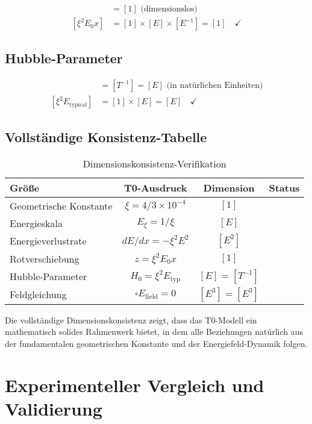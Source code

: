 \documentclass[12pt,a4paper]{article}
\begin{document}
	\begin{align}
		[z] &= [1] \text{ (dimensionslos)} \\
		[\xi^2 E_0 x] &= [1] \times [E] \times [E^{-1}] = [1] \quad \checkmark
	\end{align}
	
	\subsection{Hubble-Parameter}
	
	\begin{align}
		[H_0] &= [T^{-1}] = [E] \text{ (in natürlichen Einheiten)} \\
		[\xi^2 E_{\text{typical}}] &= [1] \times [E] = [E] \quad \checkmark
	\end{align}
	
	\subsection{Vollständige Konsistenz-Tabelle}
	
	\begin{table}[htbp]
		\centering
		\begin{tabular}{lccc}
			\toprule
			\textbf{Größe} & \textbf{T0-Ausdruck} & \textbf{Dimension} & \textbf{Status} \\
			\midrule
			Geometrische Konstante & $\xi = 4/3 \times 10^{-4}$ & $[1]$ & \checkmark \\
			Energieskala & $E_\xi = 1/\xi$ & $[E]$ & \checkmark \\
			Energieverlustrate & $dE/dx = -\xi^2 E^2$ & $[E^2]$ & \checkmark \\
			Rotverschiebung & $z = \xi^2 E_0 x$ & $[1]$ & \checkmark \\
			Hubble-Parameter & $H_0 = \xi^2 E_{\text{typ}}$ & $[E] = [T^{-1}]$ & \checkmark \\
			Feldgleichung & $\square E_{\text{field}} = 0$ & $[E^3] = [E^3]$ & \checkmark \\
			\bottomrule
		\end{tabular}
		\caption{Dimensionskonsistenz-Verifikation}
		\label{tab:dimensional_check}
	\end{table}
	
	Die vollständige Dimensionskonsistenz zeigt, dass das T0-Modell ein mathematisch solides Rahmenwerk bietet, in dem alle Beziehungen natürlich aus der fundamentalen geometrischen Konstante und der Energiefeld-Dynamik folgen.
	
	\section{Experimenteller Vergleich und Validierung}
	
\end{document}
